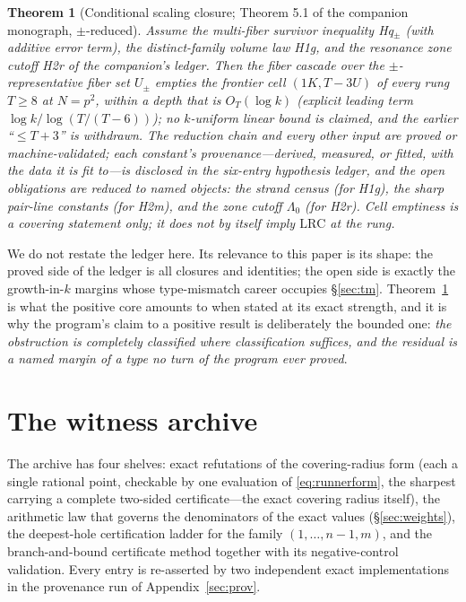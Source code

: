 \documentclass[11pt,a4paper]{article}
\numberwithin{equation}{section}
\theoremstyle{plain}
\newtheorem{theorem}{Theorem}[section]
\theoremstyle{definition}
\theoremstyle{remark}
\begin{document}
\begin{theorem}[Conditional scaling closure; Theorem 5.1 of the
companion monograph, $\pm$-reduced]\label{thm:SC}
Assume the multi-fiber survivor inequality Hq$_\pm$ (with additive error
term), the distinct-family volume law H1g, and the resonance zone cutoff
H2r of the companion's ledger. Then the fiber cascade over the
$\pm$-representative fiber set $U_\pm$ empties the frontier cell
$(1K,T{-}3U)$ of every rung $T\ge8$ at $N=p^2$, within a depth that is
$O_T(\log k)$ (explicit leading term $\log k/\log(T/(T-6))$); no
$k$-uniform linear bound is claimed, and the earlier ``$\le T+3$'' is
withdrawn. The reduction chain and every other input are proved or
machine-validated; each constant's provenance---derived, measured, or
fitted, with the data it is fit to---is disclosed in the six-entry
hypothesis ledger, and the open obligations are reduced to named objects:
the strand census (for H1g), the sharp pair-line constants (for H2m), and
the zone cutoff $\Lambda_0$ (for H2r). Cell emptiness is a covering
statement only; it does not by itself imply $\mathrm{LRC}$ at the rung.
\end{theorem}

We do not restate the ledger here. Its relevance to this paper is its
shape: the proved side of the ledger is all closures and identities; the
open side is exactly the growth-in-$k$ margins whose type-mismatch
career occupies \S\ref{sec:tm}. Theorem~\ref{thm:SC} is what the positive
core amounts to when stated at its exact strength, and it is why the
program's claim to a positive result is deliberately the bounded one:
\emph{the obstruction is completely classified where classification
suffices, and the residual is a named margin of a type no turn of the
program ever proved}.


\section{The witness archive}\label{sec:witness}

The archive has four shelves: exact refutations of the covering-radius
form (each a single rational point, checkable by one evaluation of
\eqref{eq:runnerform}, the sharpest carrying a complete two-sided
certificate---the exact covering radius itself), the arithmetic law
that governs the denominators of the
exact values (\S\ref{sec:weights}), the deepest-hole certification
ladder for the family $(1,\dots,n{-}1,m)$, and the branch-and-bound
certificate method together with its negative-control validation. Every
entry is re-asserted by two independent exact implementations in the
provenance run of Appendix~\ref{sec:prov}.
\end{document}
